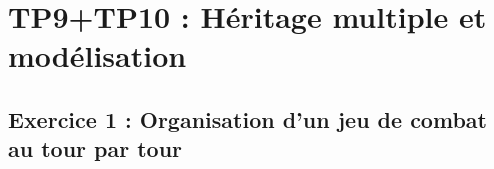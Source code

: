 \chapter{TP9+TP10 : Héritage multiple et modélisation}

\section{Exercice 1 : Organisation d’un jeu de combat au tour par tour}